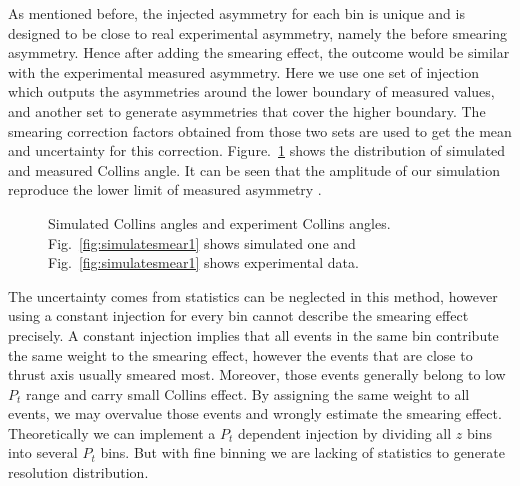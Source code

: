As mentioned before, the injected asymmetry for each bin is unique and is designed to be close to real experimental asymmetry, namely the before smearing asymmetry. Hence after adding the smearing effect, the outcome would be similar with the experimental measured asymmetry.  Here we use one set of injection which outputs the asymmetries around the lower boundary of measured values, and another set to generate asymmetries that cover the higher boundary. The smearing correction factors obtained from those two sets are used to get the mean and uncertainty for this correction. Figure.~\ref{fig:simulatesmear} shows the distribution of simulated and measured Collins angle. It can be seen that the amplitude of our simulation reproduce the lower limit of measured asymmetry .
\begin{figure}[H]
 \centering     
  \caption[Simulated Collins angles and experiment Collins angles]{Simulated Collins angles and experiment Collins angles. Fig.~\ref{fig:simulatesmear1} shows simulated one and Fig.~\ref{fig:simulatesmear1} shows experimental data. }
  \label{fig:simulatesmear}
\end{figure}

The uncertainty comes from statistics can be neglected in this method, however using a constant injection for every bin cannot describe the smearing effect precisely. A constant injection implies that all events in the same bin contribute the same weight to the smearing effect, however the events that are close to thrust axis usually smeared most. Moreover, those events generally belong to low $P_t$ range and carry small Collins effect. By assigning the same weight to all events, we may overvalue those events and wrongly estimate the smearing effect. Theoretically we can implement a $P_t$ dependent injection by dividing all $z$ bins into several $P_t$ bins. But with fine binning we are lacking of statistics to generate resolution distribution. 


